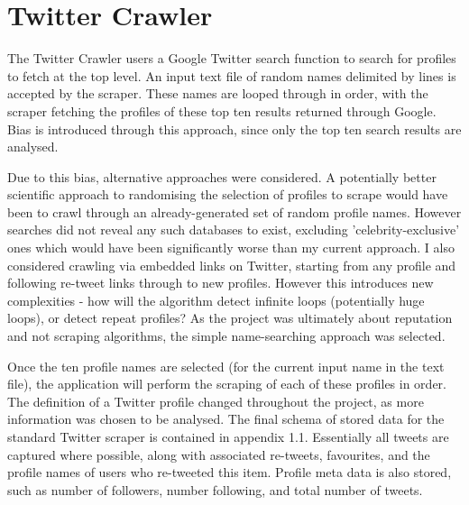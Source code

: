 
\section{Twitter Crawler}

The Twitter Crawler users a Google Twitter search function to search for profiles to fetch at the top level. An input text file of random names delimited by lines is accepted by the scraper. These names are looped through in order, with the scraper fetching the profiles of these top ten results returned through Google. Bias is introduced through this approach, since only the top ten search results are analysed. 


Due to this bias, alternative approaches were considered. A potentially better scientific approach to randomising the selection of profiles to scrape would have been to crawl through an already-generated set of random profile names. However searches did not reveal any such databases to exist, excluding 'celebrity-exclusive' ones which would have been significantly worse than my current approach. I also considered crawling via embedded links on Twitter, starting from any profile and following re-tweet links through to new profiles. However this introduces new complexities - how will the algorithm detect infinite loops (potentially huge loops), or detect repeat profiles? As the project was ultimately about reputation and not scraping algorithms, the simple name-searching approach was selected. 

Once the ten profile names are selected (for the current input name in the text file), the application will perform the scraping of each of these profiles in order.  The definition of a Twitter profile changed throughout the project, as more information was chosen to be analysed. The final schema of stored data for the standard Twitter scraper is contained in appendix 1.1. Essentially all tweets are captured where possible, along with associated re-tweets, favourites, and the profile names of users who re-tweeted this item. Profile meta data is also stored, such as number of followers, number following, and total number of tweets. 

